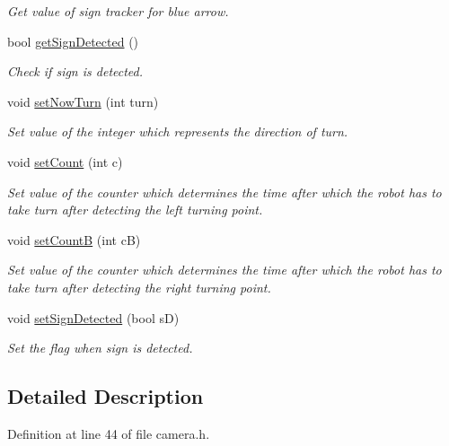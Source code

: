 \begin{DoxyCompactItemize}
\begin{DoxyCompactList}\small\item\em Get value of sign tracker for blue arrow. \end{DoxyCompactList}\item 
bool \mbox{\hyperlink{class_camera_a0f8951959a2822e6b729a9fe05b428ef}{get\+Sign\+Detected}} ()
\begin{DoxyCompactList}\small\item\em Check if sign is detected. \end{DoxyCompactList}\item 
void \mbox{\hyperlink{class_camera_a77cd72118fd9d03e04beaf60f7345138}{set\+Now\+Turn}} (int turn)
\begin{DoxyCompactList}\small\item\em Set value of the integer which represents the direction of turn. \end{DoxyCompactList}\item 
void \mbox{\hyperlink{class_camera_a3186b8e7cf648308237a2ba440379e34}{set\+Count}} (int c)
\begin{DoxyCompactList}\small\item\em Set value of the counter which determines the time after which the robot has to take turn after detecting the left turning point. \end{DoxyCompactList}\item 
void \mbox{\hyperlink{class_camera_a66d6f05a42feb58468bc4039b07b1b23}{set\+CountB}} (int cB)
\begin{DoxyCompactList}\small\item\em Set value of the counter which determines the time after which the robot has to take turn after detecting the right turning point. \end{DoxyCompactList}\item 
void \mbox{\hyperlink{class_camera_ab51102514272832890346b414759e716}{set\+Sign\+Detected}} (bool sD)
\begin{DoxyCompactList}\small\item\em Set the flag when sign is detected. \end{DoxyCompactList}\end{DoxyCompactItemize}


\subsection{Detailed Description}


Definition at line 44 of file camera.\+h.



